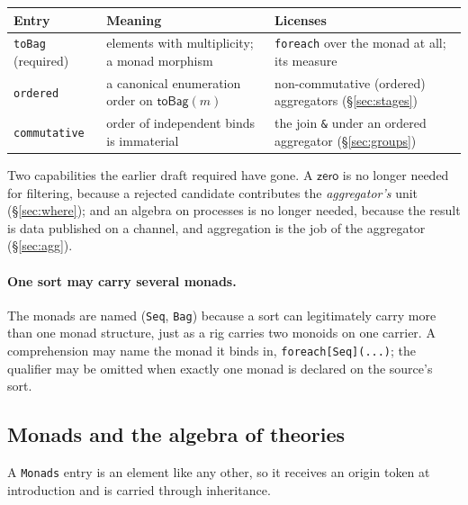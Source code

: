 \documentclass[11pt]{article}
\theoremstyle{definition}
\theoremstyle{plain}
\theoremstyle{remark}
\newcommand{\zero}{\mathsf{zero}}
\newcommand{\fe}{\texttt{foreach}}
\begin{document}
\begin{center}
\small
\begin{tabular}{@{}L{0.17\textwidth}L{0.33\textwidth}L{0.40\textwidth}@{}}
\toprule
\textbf{Entry} & \textbf{Meaning} & \textbf{Licenses} \\
\midrule
\texttt{toBag} (required) & elements with multiplicity; a monad morphism &
\fe{} over the monad at all; its measure \\[3pt]
\texttt{ordered} & a canonical enumeration order on \(\mathsf{toBag}(m)\) &
non-commutative (ordered) aggregators (\S\ref{sec:stages}) \\[3pt]
\texttt{commutative} & order of independent binds is immaterial~\cite{Kock70} &
the join \texttt{\&} under an ordered aggregator (\S\ref{sec:groups}) \\
\bottomrule
\end{tabular}
\end{center}

\noindent
Two capabilities the earlier draft required have gone. A \(\zero\) is no longer
needed for filtering, because a rejected candidate contributes the
\emph{aggregator's} unit (\S\ref{sec:where}); and an algebra on processes is no
longer needed, because the result is data published on a channel, and
aggregation is the job of the aggregator (\S\ref{sec:agg}).

\paragraph{One sort may carry several monads.} The monads are named
(\texttt{Seq}, \texttt{Bag}) because a sort can legitimately carry more than
one monad structure, just as a rig carries two monoids on one carrier. A
comprehension may name the monad it binds in, \texttt{foreach[Seq](...)};
the qualifier may be omitted when exactly one monad is declared on the
source's sort.

\subsection{Monads and the algebra of theories}
\label{sec:modules}

A \texttt{Monads} entry is an element like any other, so it receives an origin
token at introduction and is carried through inheritance.
\end{document}
